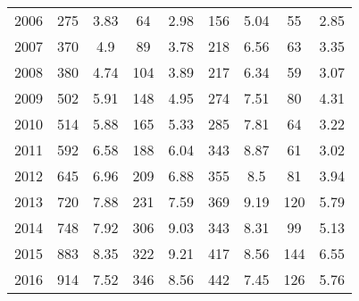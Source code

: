 \begin{table}[htbp]
\begin{tabular}{l*{8}{c}}
2006      &      275&     3.83&       64&     2.98&      156&     5.04&       55&     2.85\\
2007      &      370&      4.9&       89&     3.78&      218&     6.56&       63&     3.35\\
2008      &      380&     4.74&      104&     3.89&      217&     6.34&       59&     3.07\\
2009      &      502&     5.91&      148&     4.95&      274&     7.51&       80&     4.31\\
2010      &      514&     5.88&      165&     5.33&      285&     7.81&       64&     3.22\\
2011      &      592&     6.58&      188&     6.04&      343&     8.87&       61&     3.02\\
2012      &      645&     6.96&      209&     6.88&      355&      8.5&       81&     3.94\\
2013      &      720&     7.88&      231&     7.59&      369&     9.19&      120&     5.79\\
2014      &      748&     7.92&      306&     9.03&      343&     8.31&       99&     5.13\\
2015      &      883&     8.35&      322&     9.21&      417&     8.56&      144&     6.55\\
2016      &      914&     7.52&      346&     8.56&      442&     7.45&      126&     5.76\\
\hline\hline
\end{tabular}
\end{table}
